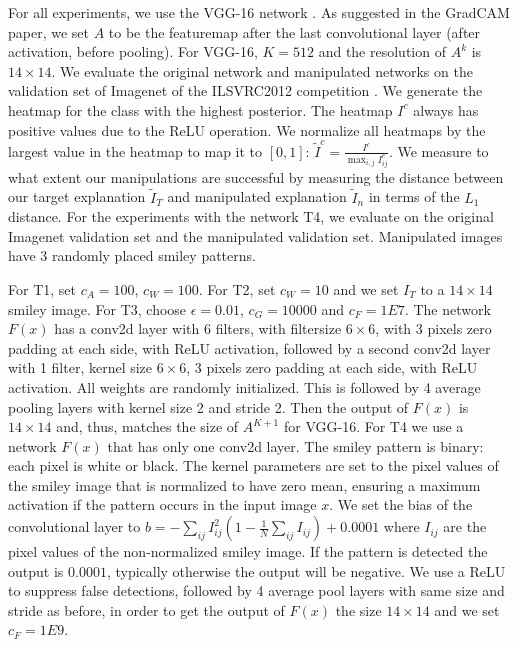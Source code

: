 \documentclass{article}
\begin{document}
For all experiments, we use the VGG-16 network \citep{Simonyan15}. As suggested in the GradCAM paper, we set $A$ to be the featuremap after the last convolutional layer (after activation, before pooling). For VGG-16, $K = 512$ and the resolution of $A^k$ is $14 \times 14$. We evaluate the original network and manipulated networks on the validation set of Imagenet of the ILSVRC2012 competition  \citep{russakovsky2015imagenet}. We generate the heatmap for the class with the highest posterior. The heatmap $I^c$ always has positive values due to the ReLU operation. We normalize all heatmaps by the largest value in the heatmap to map it to $[0,1]$: $\tilde{I}^c = \frac{I^c}{\max_{i,j} I^c_{ij}}$. We measure to what extent our manipulations are successful by measuring the distance between our target explanation $\tilde{I}_T$ and manipulated explanation $\tilde{I}_n$ in terms of the $L_1$ distance. For the experiments with the network T4, we evaluate on the original Imagenet validation set and the manipulated validation set. Manipulated images have 3 randomly placed smiley patterns. 

For T1, set $c_A = 100$, $c_W = 100$. For T2, set $c_W = 10$ and we set $I_T$ to a $14 \times 14$ smiley image. For T3, choose $\epsilon = 0.01$, $c_G = 10000$ and $c_F = 1E7$. The network $F(x)$ has a conv2d layer with 6 filters, with filtersize $6 \times 6$, with 3 pixels zero padding at each side, with ReLU activation, followed by a second conv2d layer with 1 filter, kernel size $6 \times 6$, 3 pixels zero padding at each side, with ReLU activation. All weights are randomly initialized. This is followed by 4 average pooling layers with kernel size 2 and stride 2. Then the output of $F(x)$ is $14 \times 14$ and, thus, matches the size of $A^{K+1}$ for VGG-16. For T4 we use a network $F(x)$ that has only one conv2d layer. The smiley pattern is binary: each pixel is white or black. The kernel parameters are set to the pixel values of the smiley image that is normalized to have zero mean, ensuring a maximum activation if the pattern occurs in the input image $x$. We set the bias of the convolutional layer to $b = -\sum_{ij} I_{ij}^2 (1-\frac{1}{N} \sum_{ij} I_{ij}) + 0.0001$ where $I_{ij}$ are the pixel values of the non-normalized smiley image. If the pattern is detected the output is $0.0001$, typically otherwise the output will be negative. We use a ReLU to suppress false detections, followed by 4 average pool layers with same size and stride as before, in order to get the output of $F(x)$ the size $14 \times 14$ and we set $c_F = 1E9$.
\end{document}
